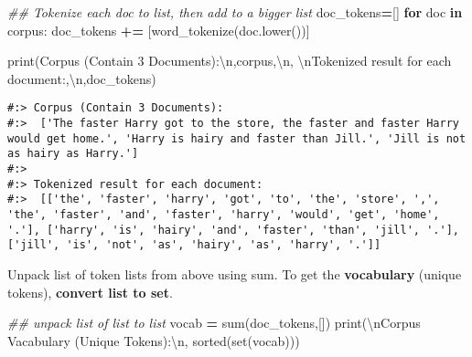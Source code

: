\documentclass[
]{book}
\newenvironment{Shaded}{\begin{snugshade}}{\end{snugshade}}
\newcommand{\BuiltInTok}[1]{#1}
\newcommand{\CharTok}[1]{\textcolor[rgb]{0.5,0.5,0.5}{#1}}
\newcommand{\CommentTok}[1]{\textcolor[rgb]{0.37,0.37,0.37}{\textit{#1}}}
\newcommand{\ControlFlowTok}[1]{\textcolor[rgb]{0.27,0.27,0.27}{\textbf{#1}}}
\newcommand{\KeywordTok}[1]{\textcolor[rgb]{0.27,0.27,0.27}{\textbf{#1}}}
\newcommand{\NormalTok}[1]{#1}
\newcommand{\OperatorTok}[1]{\textcolor[rgb]{0.43,0.43,0.43}{\textbf{#1}}}
\newcommand{\StringTok}[1]{\textcolor[rgb]{0.5,0.5,0.5}{#1}}
\begin{document}
\begin{Shaded}
\begin{Highlighting}[]
\CommentTok{\#\# Tokenize each doc to list, then add to a bigger list}
\NormalTok{doc\_tokens}\OperatorTok{=}\NormalTok{[]}
\ControlFlowTok{for}\NormalTok{ doc }\KeywordTok{in}\NormalTok{ corpus:}
\NormalTok{  doc\_tokens }\OperatorTok{+=}\NormalTok{ [word\_tokenize(doc.lower())]}

\BuiltInTok{print}\NormalTok{(}\StringTok{\textquotesingle{}Corpus (Contain 3 Documents):}\CharTok{\textbackslash{}n}\StringTok{\textquotesingle{}}\NormalTok{,corpus,}\StringTok{\textquotesingle{}}\CharTok{\textbackslash{}n}\StringTok{\textquotesingle{}}\NormalTok{,}
      \StringTok{\textquotesingle{}}\CharTok{\textbackslash{}n}\StringTok{Tokenized result for each document:\textquotesingle{}}\NormalTok{,}\StringTok{\textquotesingle{}}\CharTok{\textbackslash{}n}\StringTok{\textquotesingle{}}\NormalTok{,doc\_tokens)}
\end{Highlighting}
\end{Shaded}

\begin{verbatim}
#:> Corpus (Contain 3 Documents):
#:>  ['The faster Harry got to the store, the faster and faster Harry would get home.', 'Harry is hairy and faster than Jill.', 'Jill is not as hairy as Harry.'] 
#:>  
#:> Tokenized result for each document: 
#:>  [['the', 'faster', 'harry', 'got', 'to', 'the', 'store', ',', 'the', 'faster', 'and', 'faster', 'harry', 'would', 'get', 'home', '.'], ['harry', 'is', 'hairy', 'and', 'faster', 'than', 'jill', '.'], ['jill', 'is', 'not', 'as', 'hairy', 'as', 'harry', '.']]
\end{verbatim}

Unpack list of token lists from above using sum. To get the \textbf{vocabulary} (unique tokens), \textbf{convert list to set}.

\begin{Shaded}
\begin{Highlighting}[]
\CommentTok{\#\# unpack list of list to list}
\NormalTok{vocab }\OperatorTok{=} \BuiltInTok{sum}\NormalTok{(doc\_tokens,[])}
\BuiltInTok{print}\NormalTok{(}\StringTok{\textquotesingle{}}\CharTok{\textbackslash{}n}\StringTok{Corpus Vacabulary (Unique Tokens):}\CharTok{\textbackslash{}n}\StringTok{\textquotesingle{}}\NormalTok{,}
       \BuiltInTok{sorted}\NormalTok{(}\BuiltInTok{set}\NormalTok{(vocab)))}
\end{Highlighting}
\end{Shaded}
\end{document}
